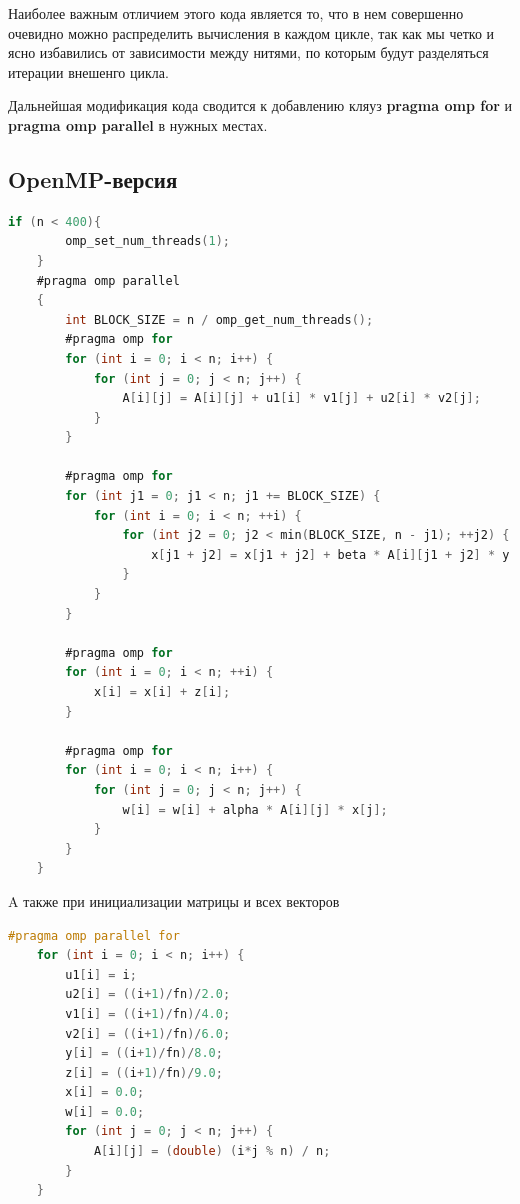 \documentclass{article}
\begin{document}
\vspace{0.5cm}
Наиболее важным отличием этого кода является то, что в нем совершенно очевидно можно распределить вычисления в каждом цикле, так как мы четко и ясно избавились от зависимости между нитями, по которым будут разделяться итерации внешенго цикла.

Дальнейшая модификация кода сводится к добавлению кляуз \textbf{pragma omp for} и \textbf{pragma omp parallel} в нужных местах.

\subsection {OpenMP-версия} 
\vspace{0.5cm}

\begin{lstlisting}[language = C]
    if (n < 400){
        omp_set_num_threads(1);
    }
    #pragma omp parallel
    {
        int BLOCK_SIZE = n / omp_get_num_threads();
        #pragma omp for
        for (int i = 0; i < n; i++) {
            for (int j = 0; j < n; j++) {
                A[i][j] = A[i][j] + u1[i] * v1[j] + u2[i] * v2[j];
            }
        }

        #pragma omp for
        for (int j1 = 0; j1 < n; j1 += BLOCK_SIZE) {
            for (int i = 0; i < n; ++i) {
                for (int j2 = 0; j2 < min(BLOCK_SIZE, n - j1); ++j2) {
                    x[j1 + j2] = x[j1 + j2] + beta * A[i][j1 + j2] * y[i];
                }
            }
        }

        #pragma omp for
        for (int i = 0; i < n; ++i) {
            x[i] = x[i] + z[i];
        }

        #pragma omp for
        for (int i = 0; i < n; i++) {
            for (int j = 0; j < n; j++) {
                w[i] = w[i] + alpha * A[i][j] * x[j];
            }
        }
    }
\end{lstlisting}
\vspace{0.5cm}

A также при инициализации матрицы и всех векторов
\begin{lstlisting}[language = C]
    #pragma omp parallel for
    for (int i = 0; i < n; i++) {
        u1[i] = i;
        u2[i] = ((i+1)/fn)/2.0;
        v1[i] = ((i+1)/fn)/4.0;
        v2[i] = ((i+1)/fn)/6.0;
        y[i] = ((i+1)/fn)/8.0;
        z[i] = ((i+1)/fn)/9.0;
        x[i] = 0.0;
        w[i] = 0.0;
        for (int j = 0; j < n; j++) {
            A[i][j] = (double) (i*j % n) / n;
        }
    }
\end{lstlisting}
\end{document}
